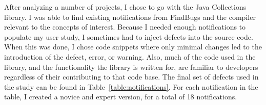 After analyzing a number of projects, I chose to go with the Java Collections library. I was able to find existing notifications from FindBugs and the compiler relevant to the concepts of interest. Because I needed enough notifications to populate my user study, I sometimes had to inject defects into the source code. When this was done, I chose code snippets where only minimal changes led to the introduction of the defect, error, or warning. Also, much of the code used in the library, and the functionality the library is written for, are familiar to developers regardless of their contributing to that code base.
The final set of defects used in the study can be found in Table~\ref{table:notifications}. For each notification in the table, I created a novice and expert version, for a total of 18 notifications.


